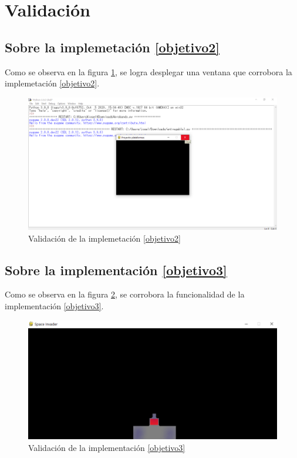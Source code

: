 \documentclass[12pt,letterpaper]{article}
\begin{document}
\section{Validación}

\subsection{Sobre la implemetación \ref{objetivo2}}
Como se observa en la figura \ref{validacion102}, se logra desplegar una ventana que corrobora la implemetación \ref{objetivo2}.
\begin{figure}[H]
    \centering
    \includegraphics[width=0.7\linewidth]{validacion102.png}
    \caption{Validación de la implemetación \ref{objetivo2}}
    \label{validacion102}
\end{figure}

\subsection{Sobre la implementación \ref{objetivo3}}
Como se observa en la figura \ref{validacion01}, se corrobora la funcionalidad de la implementación \ref{objetivo3}.
\begin{figure}[H]
    \centering
    \includegraphics[width=0.7\linewidth]{validacion01.png}
    \caption{Validación de la implementación \ref{objetivo3}}
    \label{validacion01}
\end{figure}
\end{document}
